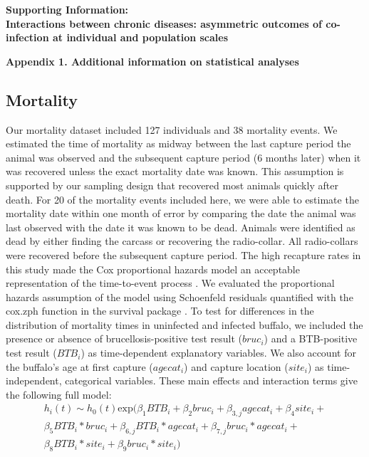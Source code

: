 \documentclass[10pt,letterpaper]{article}
\begin{document}
\pagebreak

\begin{center}
\textbf{\Large Supporting Information: \\
Interactions between chronic diseases: asymmetric outcomes of co-infection at individual and population scales}
\end{center}

\noindent \Large{\textbf{Appendix 1. Additional information on statistical analyses}}\\
\normalsize

{\subsection*{Mortality}}
Our mortality dataset included 127 individuals and 38 mortality events. We estimated the time of mortality as midway between the last capture period the animal was observed and the subsequent capture period (6 months later) when it was recovered unless the exact mortality date was known. This assumption is supported by
our sampling design that recovered most animals quickly after death. For 20 of the mortality events included here, we were able to estimate the mortality date within one month of error by comparing the date the animal was last observed with the date it was known to be dead. Animals were identified as dead by either finding the carcass or recovering the radio-collar. All radio-collars were recovered before the subsequent capture period. The high recapture rates in this study made the Cox proportional hazards model an acceptable representation of the time-to-event process \cite{fisher_time-dependent_1999}. We evaluated the proportional hazards assumption of the model using Schoenfeld residuals \cite{grambsch_proportional_1994, fox_cox_2011} quantified with the cox.zph function in the survival package \cite{therneau_package_2014}.
To test for differences in the distribution of mortality times in uninfected and infected buffalo, we included the presence or absence of brucellosis-positive test result ($bruc_i$) and a BTB-positive test result ($BTB_i$) as time-dependent explanatory variables. We also account for the buffalo's age at first capture ($agecat_i$) and capture location ($site_i$) as time-independent, categorical variables. These main effects and interaction terms give the following full model:
\begin{gather*}
h_{i}(t) \sim h_{0}(t) \text{exp} (\beta_{1} BTB_i + \beta_{2} bruc_i + \beta_{3,j}agecat_i + \beta_4 site_i + \\
\beta_5 BTB_i * bruc_i + \beta_{6,j} BTB_i * agecat_i + \beta_{7,j} bruc_i * agecat_i + \\
 \beta_8 BTB_i * site_i + \beta_9 bruc_i * site_i)
\end{gather*}
\end{document}
